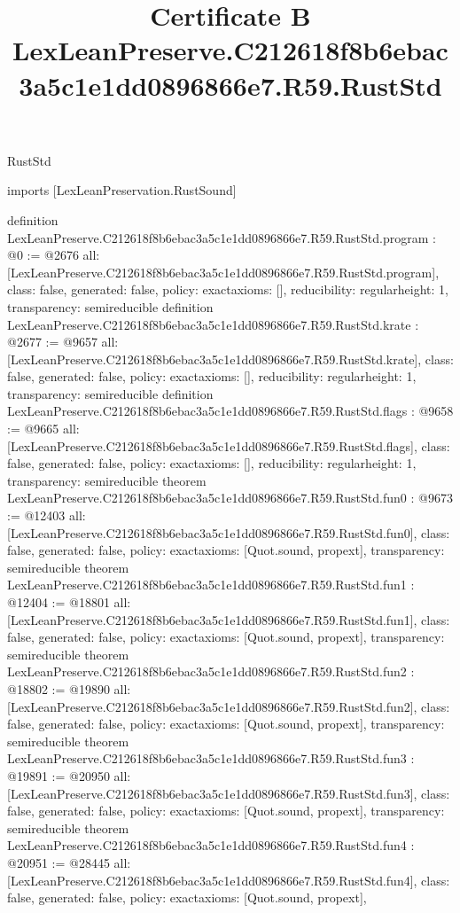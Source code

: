 \begin{lexlean}{RustStd}
\title{Certificate B LexLeanPreserve.C212618f8b6ebac3a5c1e1dd0896866e7.R59.RustStd}
\begin{coremodule}
imports [LexLeanPreservation.RustSound]

definition LexLeanPreserve.C212618f8b6ebac3a5c1e1dd0896866e7.R59.RustStd.program : @0 := @2676 {
  all: [LexLeanPreserve.C212618f8b6ebac3a5c1e1dd0896866e7.R59.RustStd.program],
  class: false,
  generated: false,
  policy: exact{axioms: []},
  reducibility: regular{height: 1},
  transparency: semireducible
}
definition LexLeanPreserve.C212618f8b6ebac3a5c1e1dd0896866e7.R59.RustStd.krate : @2677 := @9657 {
  all: [LexLeanPreserve.C212618f8b6ebac3a5c1e1dd0896866e7.R59.RustStd.krate],
  class: false,
  generated: false,
  policy: exact{axioms: []},
  reducibility: regular{height: 1},
  transparency: semireducible
}
definition LexLeanPreserve.C212618f8b6ebac3a5c1e1dd0896866e7.R59.RustStd.flags : @9658 := @9665 {
  all: [LexLeanPreserve.C212618f8b6ebac3a5c1e1dd0896866e7.R59.RustStd.flags],
  class: false,
  generated: false,
  policy: exact{axioms: []},
  reducibility: regular{height: 1},
  transparency: semireducible
}
theorem LexLeanPreserve.C212618f8b6ebac3a5c1e1dd0896866e7.R59.RustStd.fun0 : @9673 := @12403 {
  all: [LexLeanPreserve.C212618f8b6ebac3a5c1e1dd0896866e7.R59.RustStd.fun0],
  class: false,
  generated: false,
  policy: exact{axioms: [Quot.sound, propext]},
  transparency: semireducible
}
theorem LexLeanPreserve.C212618f8b6ebac3a5c1e1dd0896866e7.R59.RustStd.fun1 : @12404 := @18801 {
  all: [LexLeanPreserve.C212618f8b6ebac3a5c1e1dd0896866e7.R59.RustStd.fun1],
  class: false,
  generated: false,
  policy: exact{axioms: [Quot.sound, propext]},
  transparency: semireducible
}
theorem LexLeanPreserve.C212618f8b6ebac3a5c1e1dd0896866e7.R59.RustStd.fun2 : @18802 := @19890 {
  all: [LexLeanPreserve.C212618f8b6ebac3a5c1e1dd0896866e7.R59.RustStd.fun2],
  class: false,
  generated: false,
  policy: exact{axioms: [Quot.sound, propext]},
  transparency: semireducible
}
theorem LexLeanPreserve.C212618f8b6ebac3a5c1e1dd0896866e7.R59.RustStd.fun3 : @19891 := @20950 {
  all: [LexLeanPreserve.C212618f8b6ebac3a5c1e1dd0896866e7.R59.RustStd.fun3],
  class: false,
  generated: false,
  policy: exact{axioms: [Quot.sound, propext]},
  transparency: semireducible
}
theorem LexLeanPreserve.C212618f8b6ebac3a5c1e1dd0896866e7.R59.RustStd.fun4 : @20951 := @28445 {
  all: [LexLeanPreserve.C212618f8b6ebac3a5c1e1dd0896866e7.R59.RustStd.fun4],
  class: false,
  generated: false,
  policy: exact{axioms: [Quot.sound, propext]},
}
\end{coremodule}
\end{lexlean}
